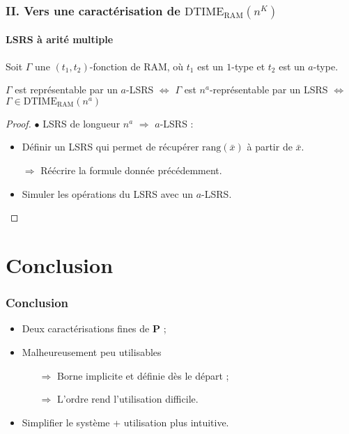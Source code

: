 \documentclass[10pt]{beamer}
\newcommand{\dtimeram}{\text{DTIME}_{\text{RAM}}\left( n^K \right)}
\newcommand{\dtimeramarg}[1]{\text{DTIME}_{\text{RAM}}\left( n^{#1} \right)}
\newcommand{\rang}[1]{\text{rang}\left( #1 \right)}
\begin{document}
	\begin{frame}
		\frametitle{II. Vers une caractérisation de $\dtimeram$}
		\framesubtitle{LSRS à arité multiple}
		
		\begin{thm}
			Soit $\Gamma$ une $(t_1,t_2)$-fonction de RAM, où $t_1$ est un $1$-type et $t_2$ est un $a$-type.
			
			$\Gamma$ est représentable par un $a$-LSRS $\Leftrightarrow$ $\Gamma$ est $n^a$-représentable par un LSRS $\Leftrightarrow$ $\Gamma \in \dtimeramarg{a}$
		\end{thm}
		
		\begin{proof}
			$\bullet$ LSRS de longueur $n^a$ $\Rightarrow$ $a$-LSRS :
			\begin{itemize}
				\item 	Définir un LSRS qui permet de récupérer $\rang{\bar{x}}$ à partir de $\bar{x}$.
				\item[$\Rightarrow$] Réécrire la formule donnée précédemment.
				\pause 
				\item	Simuler les opérations du LSRS avec un $a$-LSRS.
			\end{itemize}
			
		\end{proof}
	\end{frame}

	
	
	\section{Conclusion}
	
	
	\begin{frame}
		\frametitle{Conclusion}
		
		\begin{itemize}
			\item 	Deux caractérisations fines de $\textbf{P}$ ;
			\pause
			\item 	Malheureusement peu utilisables
			\begin{itemize}
				\item[$\Rightarrow$] Borne implicite et définie dès le départ ;
				\pause 
				\item[$\Rightarrow$] L'ordre rend l'utilisation difficile.
			\end{itemize}
			
			\pause 
			\item 	Simplifier le système + utilisation plus intuitive.
		\end{itemize}
		
	\end{frame}
	
	
\end{document}
